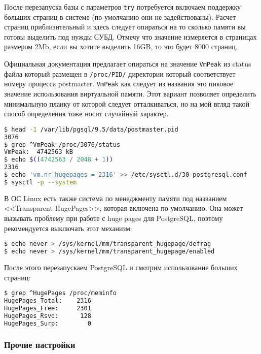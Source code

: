 После перезапуска базы с параметров \lstinline!try! потребуется включаем поддержку больших страниц в системе (по-умолчанию они не задействованы). Расчет страниц приблизительный и здесь следует опираться на то сколько памяти вы готовы выделить под нужды СУБД. Отмечу что значение измеряется в страницах размером 2Mb, если вы хотите выделить 16GB, то это будет 8000 страниц.

Официальная документация предлагает опираться на значение \lstinline!VmPeak! из status файла который размещен в \lstinline!/proc/PID/! директории который соответствует номеру процесса postmaster. \lstinline!VmPeak! как следует из названия это пиковое значение использования виртуальной памяти. Этот вариант позволяет определить минимальную планку от которой следует отталкиваться, но на мой вгляд такой способ определения тоже носит случайный характер.

\begin{lstlisting}[language=Bash,label=lst:settings_hugepages2,caption=Включаем поддержку huge pages в системе]
$ head -1 /var/lib/pgsql/9.5/data/postmaster.pid
3076
$ grep ^VmPeak /proc/3076/status
VmPeak:  4742563 kB
$ echo $((4742563 / 2048 + 1))
2316
$ echo 'vm.nr_hugepages = 2316' >> /etc/sysctl.d/30-postgresql.conf
$ sysctl -p --system
\end{lstlisting}

В ОС Linux есть также система по менеджменту памяти под названием <<Transparent HugePages>>, которая включена по умолчанию. Она может вызывать проблему при работе с huge pages для PostgreSQL, поэтому рекомендуется выключать этот механизм:

\begin{lstlisting}[language=Bash,label=lst:settings_hugepages3,caption=Отключаем Transparent HugePages]
$ echo never > /sys/kernel/mm/transparent_hugepage/defrag
$ echo never > /sys/kernel/mm/transparent_hugepage/enabled
\end{lstlisting}

После этого перезапускаем PostgreSQL и смотрим использование больших страниц:

\begin{lstlisting}[language=Bash,label=lst:settings_hugepages4,caption=Проверяем использование huge pages]
$ grep ^HugePages /proc/meminfo
HugePages_Total:    2316
HugePages_Free:     2301
HugePages_Rsvd:      128
HugePages_Surp:        0
\end{lstlisting}


\subsubsection{Прочие настройки}

